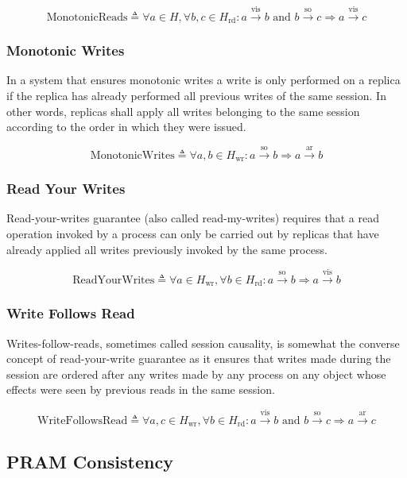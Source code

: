 $$
  \text{MonotonicReads} \triangleq \forall a \in H, \forall b, c \in H_\text{rd}: a \xrightarrow{\text{vis}} b \text{ and } b \xrightarrow{\text{so}} c \Rightarrow a \xrightarrow{\text{vis}} c
$$

\subsubsection{Monotonic Writes}

In a system that ensures monotonic writes a write is only performed on a replica
if the replica has already performed all previous writes of the same session. In
other words, replicas shall apply all writes belonging to the same session
according to the order in which they were issued.

$$
  \text{MonotonicWrites} \triangleq \forall a, b \in H_\text{wr}: a \xrightarrow{\text{so}} b \Rightarrow a \xrightarrow{\text{ar}} b
$$

\subsubsection{Read Your Writes}

Read-your-writes guarantee (also called read-my-writes) requires that a read
operation invoked by a process can only be carried out by replicas that have
already applied all writes previously invoked by the same process.

$$
  \text{ReadYourWrites} \triangleq \forall a \in H_\text{wr}, \forall b \in H_\text{rd}: a \xrightarrow{\text{so}} b \Rightarrow a \xrightarrow{\text{vis}} b
$$

\subsubsection{Write Follows Read}

Writes-follow-reads, sometimes called session causality, is somewhat the
converse concept of read-your-write guarantee as it ensures that writes made
during the session are ordered after any writes made by any process on any
object whose effects were seen by previous reads in the same session.

$$
  \text{WriteFollowsRead} \triangleq \forall a, c \in H_\text{wr}, \forall b \in H_\text{rd}: a \xrightarrow{\text{vis}} b \text{ and } b \xrightarrow{\text{so}} c \Rightarrow a \xrightarrow{\text{ar}} c
$$

\subsection{PRAM Consistency}


